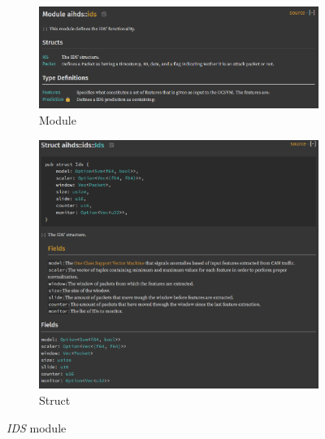 \begin{figure}
    \centering
    \begin{subfigure}[b]{\linewidth}
        \includegraphics[width = \linewidth]{img/parts/docs/ids/ids.png}
        \caption{Module}
        \label{subfig:doc_ids}
    \end{subfigure}
    \begin{subfigure}[b]{\linewidth}
        \includegraphics[width = \linewidth]{img/parts/docs/ids/ids_struct.png}
        \caption{Struct}
        \label{subfig:doc_ids_struct}
    \end{subfigure}
    \caption{\emph{IDS} module}
    \label{fig:doc_ids}
\end{figure}
